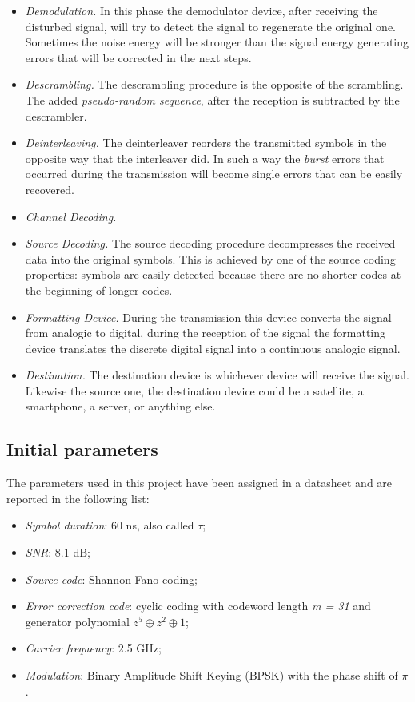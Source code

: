 \begin{itemize}
    \item \textsl{Demodulation.} In this phase the demodulator device, after receiving the disturbed signal, will try to detect the signal to regenerate the original one. Sometimes the noise energy will be stronger than the signal energy generating errors that will be corrected in the next steps.
    \item \textsl{Descrambling.} The descrambling procedure is the opposite of the scrambling. The added \textit{pseudo-random sequence}, after the reception is subtracted by the descrambler.
    \item \textsl{Deinterleaving.} The deinterleaver reorders the transmitted symbols in the opposite way that the interleaver did. In such a way the \textit{burst} errors that occurred during the transmission will become single errors that can be easily recovered.
    \item \textsl{Channel Decoding.} 
    \item \textsl{Source Decoding.} The source decoding procedure decompresses the received data into the original symbols. This is achieved by one of the source coding properties: symbols are easily detected because there are no shorter codes at the beginning of longer codes.
    \item \textsl{Formatting Device.} During the transmission this device converts the signal from analogic to digital, during the reception of the signal the formatting device translates the discrete digital signal into a continuous analogic signal. 
    \item \textsl{Destination.} The destination device is whichever device will receive the signal. Likewise the source one, the destination device could be a satellite, a smartphone, a server, or anything else.
\end{itemize}

\subsection{Initial parameters}\label{initial-parameters}
The parameters used in this project have been assigned in a datasheet and are reported in the following list:
\vspace{-5px}
\begin{itemize}
    \renewcommand{\labelitemi}{$\cdot$}
    \setlength{\itemsep}{-2px}
    \item \textsl{Symbol duration}: 60 ns, also called $\tau$;
    \item \textsl{SNR}: 8.1 dB;
    \item \textsl{Source code}: Shannon-Fano coding;
    \item \textsl{Error correction code}: cyclic coding with codeword length \textit{m = 31} and generator polynomial $ z^5 \oplus z^2 \oplus 1$;
    \item \textsl{Carrier frequency}: 2.5 GHz;
    \item \textsl{Modulation}: Binary Amplitude Shift Keying (BPSK) with the phase shift of $\pi$.
\end{itemize}

